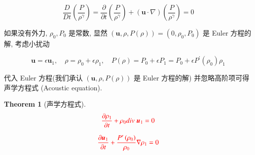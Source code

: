 \documentclass[11pt]{article}
\newtheorem{theorem}{Theorem}[subsection]
\begin{document}
\vspace{-1cm}

\begin{equation}
\frac{D}{{Dt}}\left( {\frac{P}{{{\rho ^\gamma }}}} \right) = \frac{\partial }{{\partial t}}\left( {\frac{P}{{{\rho ^\gamma }}}} \right) + \left( {\boldsymbol{u} \cdot \nabla } \right)\left( {\frac{P}{{{\rho ^\gamma }}}} \right) = 0
\label{eq5.1.24}
\end{equation}

如果没有外力, ${\rho _0},{P_0}$ 是常数, 显然 $\left( {\boldsymbol{u},\rho ,P\left( \rho  \right)} \right) = \left( {0,{\rho _0},{P_0}} \right)$ 是 Euler 方程的解, 考虑小扰动

\begin{equation}
\boldsymbol{u} = \epsilon \boldsymbol{u}_{1}, \quad \rho = \rho_0 + \epsilon \rho_1, \quad P(\rho) = P_{0} + \epsilon P_{1} = P_{0} + \epsilon P^{\prime}(\rho_0)\rho_1
\label{eq5.1.25}
\end{equation}

代入 Euler 方程(我们承认 $ (\boldsymbol{u}, \rho, P(\rho)) $ 是 Euler 方程的解) 并忽略高阶项可得声学方程式 (Acoustic equation).

\begin{theorem}[\kaishu 声学方程式]
	\begin{equation}
	\color{red}
	\frac{{\partial {\rho _1}}}{{\partial t}} + {\rho _0}div\;{\boldsymbol{u}_1} = 0
	\label{eq5.1.26}
	\end{equation}
	
	\vspace{-1.5cm}
	
	\begin{equation}
	\color{red}
	\frac{{\partial {\boldsymbol{u}_1}}}{{\partial t}} + \frac{{P^{\prime}\left( {{\rho _0}} \right)}}{{{\rho _0}}}\nabla {\rho _1} = 0
	\label{eq5.1.27}
	\end{equation}
\end{theorem}
\end{document}
